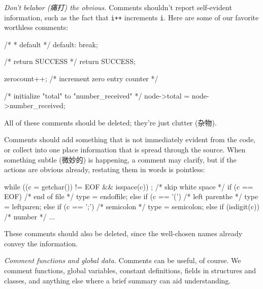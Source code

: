 \emph{Don't belabor (痛打) the obvious.} Comments shouldn't report
self-evident information, such as the fact that \verb'i++' increments
\verb'i'. Here are some of our favorite worthless comments:
\begin{badcode}
    /* 
     * default 
     */
    default:
        break;
\end{badcode}
\begin{badcode}
    /* return SUCCESS */
    return SUCCESS;
\end{badcode}
\begin{badcode}
    zerocount++;    /* increment zero entry counter */
\end{badcode}
\begin{badcode}
    /* initialize "total" to "number_received" */
    node->total = node->number_received;
\end{badcode}
All of these comments should be deleted; they're just clutter (杂物).

Comments should add something that is not immediately evident from the code,
or collect into one place information that is spread through the source.
When something subtle (微妙的) is happening, a comment may clarify, but if
the actions are obvious already, restating them in words is pointless:
\begin{badcode}
    while ((c = getchar()) != EOF && isspace(c))
        ;   /* skip white space */
    if (c == EOF)   /* end of file */
        type = endoffile;
    else if (c == '(')  /* left parenthe */
        type = leftparen;
    else if (c == ';')  /* semicolon */
        type = semicolon;
    else if (isdigit(c))    /* number */
        ...
\end{badcode}
These comments should also be deleted, since the well-chosen names already
convey the information.

\emph{Comment functions and global data.} Comments can be useful, of
course. We comment functions, global variables, constant definitions,
fields in structures and classes, and anything else where a brief summary
can aid understanding.

